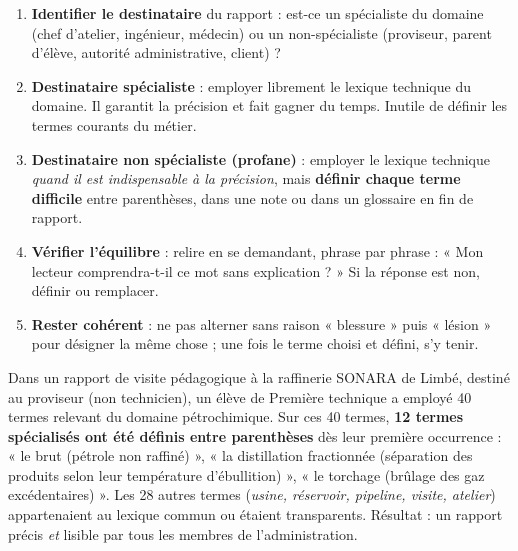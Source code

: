 \documentclass[11pt]{article}
\begin{document}
\begin{methode}
\begin{enumerate}
\item \textbf{Identifier le destinataire} du rapport : est-ce un spécialiste du domaine (chef d'atelier, ingénieur, médecin) ou un non-spécialiste (proviseur, parent d'élève, autorité administrative, client) ?
\item \textbf{Destinataire spécialiste} : employer librement le lexique technique du domaine. Il garantit la précision et fait gagner du temps. Inutile de définir les termes courants du métier.
\item \textbf{Destinataire non spécialiste (profane)} : employer le lexique technique \emph{quand il est indispensable à la précision}, mais \textbf{définir chaque terme difficile} entre parenthèses, dans une note ou dans un glossaire en fin de rapport.
\item \textbf{Vérifier l'équilibre} : relire en se demandant, phrase par phrase : « Mon lecteur comprendra-t-il ce mot sans explication ? » Si la réponse est non, définir ou remplacer.
\item \textbf{Rester cohérent} : ne pas alterner sans raison « blessure » puis « lésion » pour désigner la même chose ; une fois le terme choisi et défini, s'y tenir.
\end{enumerate}
\end{methode}

\begin{exemplebox}
Dans un rapport de visite pédagogique à la raffinerie SONARA de Limbé, destiné au proviseur (non technicien), un élève de Première technique a employé 40 termes relevant du domaine pétrochimique. Sur ces 40 termes, \textbf{12 termes spécialisés ont été définis entre parenthèses} dès leur première occurrence : « le brut (pétrole non raffiné) », « la distillation fractionnée (séparation des produits selon leur température d'ébullition) », « le torchage (brûlage des gaz excédentaires) ». Les 28 autres termes (\emph{usine, réservoir, pipeline, visite, atelier}) appartenaient au lexique commun ou étaient transparents. Résultat : un rapport précis \emph{et} lisible par tous les membres de l'administration.
\end{exemplebox}
\end{document}
